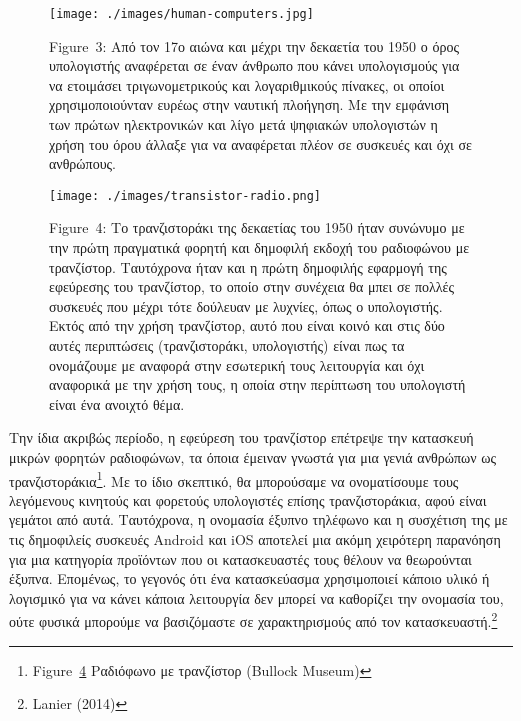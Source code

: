 \documentclass[
]{article}
\begin{document}
\leavevmode{}%
\begin{figure}
\hypertarget{fig:human-computers}{%
\centering
\texttt{[image: ./images/human-computers.jpg]}
\caption{Figure~3: Από τον 17ο αιώνα και μέχρι την δεκαετία του 1950 ο
όρος υπολογιστής αναφέρεται σε έναν άνθρωπο που κάνει υπολογισμούς για
να ετοιμάσει τριγωνομετρικούς και λογαριθμικούς πίνακες, οι οποίοι
χρησιμοποιούνταν ευρέως στην ναυτική πλοήγηση. Με την εμφάνιση των
πρώτων ηλεκτρονικών και λίγο μετά ψηφιακών υπολογιστών η χρήση του όρου
άλλαξε για να αναφέρεται πλέον σε συσκευές και όχι σε
ανθρώπους.}\label{fig:human-computers}
}
\end{figure}

\leavevmode{}%
\begin{figure}
\hypertarget{fig:transistor-radio}{%
\centering
\texttt{[image: ./images/transistor-radio.png]}
\caption{Figure~4: Το τρανζιστοράκι της δεκαετίας του 1950 ήταν συνώνυμο
με την πρώτη πραγματικά φορητή και δημοφιλή εκδοχή του ραδιοφώνου με
τρανζίστορ. Ταυτόχρονα ήταν και η πρώτη δημοφιλής εφαρμογή της εφεύρεσης
του τρανζίστορ, το οποίο στην συνέχεια θα μπει σε πολλές συσκευές που
μέχρι τότε δούλευαν με λυχνίες, όπως ο υπολογιστής. Εκτός από την χρήση
τρανζίστορ, αυτό που είναι κοινό και στις δύο αυτές περιπτώσεις
(τρανζιστοράκι, υπολογιστής) είναι πως τα ονομάζουμε με αναφορά στην
εσωτερική τους λειτουργία και όχι αναφορικά με την χρήση τους, η οποία
στην περίπτωση του υπολογιστή είναι ένα ανοιχτό
θέμα.}\label{fig:transistor-radio}
}
\end{figure}

Την ίδια ακριβώς περίοδο, η εφεύρεση του τρανζίστορ επέτρεψε την
κατασκευή μικρών φορητών ραδιοφώνων, τα όποια έμειναν γνωστά για μια
γενιά ανθρώπων ως τρανζιστοράκια\footnote{Figure~\protect\hyperlink{fig:transistor-radio}{4}
  Ραδιόφωνο με τρανζίστορ (Bullock Museum)}. Με το ίδιο σκεπτικό, θα
μπορούσαμε να ονοματίσουμε τους λεγόμενους κινητούς και φορετούς
υπολογιστές επίσης τρανζιστοράκια, αφού είναι γεμάτοι από αυτά.
Ταυτόχρονα, η ονομασία έξυπνο τηλέφωνο και η συσχέτιση της με τις
δημοφιλείς συσκευές Android και iOS αποτελεί μια ακόμη χειρότερη
παρανόηση για μια κατηγορία προϊόντων που οι κατασκευαστές τους θέλουν
να θεωρούνται έξυπνα. Επομένως, το γεγονός ότι ένα κατασκεύασμα
χρησιμοποιεί κάποιο υλικό ή λογισμικό για να κάνει κάποια λειτουργία δεν
μπορεί να καθορίζει την ονομασία του, ούτε φυσικά μπορούμε να
βασιζόμαστε σε χαρακτηρισμούς από τον κατασκευαστή.\footnote{Lanier
  (2014)}
\end{document}
